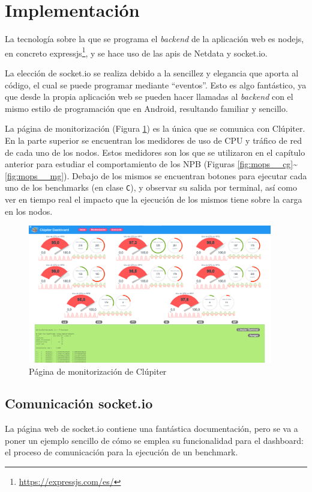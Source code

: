 \section{Implementación}
La tecnología sobre la que se programa el \textit{\gls{backend}} de la aplicación web es nodejs, en concreto expressjs\footnote{\url{https://expressjs.com/es/}}, y se hace uso de las \acrshort{api}s de Netdata y socket.io.

La elección de socket.io se realiza debido a la sencillez y elegancia que aporta al código, el cual se puede programar mediante ``eventos''. Esto es algo fantástico, ya que desde la propia aplicación web se pueden hacer llamadas al \textit{\gls{backend}} con el mismo estilo de programación que en Android, resultando familiar y sencillo.

La página de monitorización (Figura \ref{fig:pagina_monitorizacion}) es la única que se comunica con Clúpiter. En la parte superior se encuentran los medidores de uso de CPU y tráfico de red de cada uno de los nodos. Estos medidores son los que se utilizaron en el capítulo anterior para estudiar el comportamiento de los NPB (Figuras \ref{fig:mops__cg}\textasciitilde\ref{fig:mops__mg}). Debajo de los mismos se encuentran botones para ejecutar cada uno de los benchmarks (en clase \texttt{C}), y observar su salida por terminal, así como ver en tiempo real el impacto que la ejecución de los mismos tiene sobre la carga en los nodos.


\begin{figure}[h!]
  \centering
  \includegraphics[width=0.95\textwidth]{img/dashboard/monitoring.png}
  \caption{Página de monitorización de Clúpiter}
  \label{fig:pagina_monitorizacion}
\end{figure}

\subsection{Comunicación socket.io}
\label{ssec:socket.io_comm}
La página web de socket.io contiene una fantástica documentación, pero se va a poner un ejemplo sencillo de cómo se emplea su funcionalidad para el dashboard: el proceso de comunicación para la ejecución de un benchmark.

